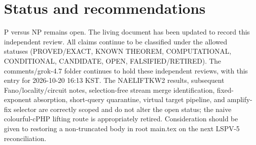 \documentclass[11pt]{article}
\begin{document}
\section{Status and recommendations}
P versus NP remains open. The living document has been updated to record this independent review. All claims continue to be classified under the allowed statuses (PROVED/EXACT, KNOWN THEOREM, COMPUTATIONAL, CONDITIONAL, CANDIDATE, OPEN, FALSIFIED/RETIRED). The comments/grok-4.7 folder continues to hold these independent reviews, with this entry for 2026-10-20 16:13 KST. The NAELIFTKW2 results, subsequent Fano/locality/circuit notes, selection-free stream merge identification, fixed-exponent absorption, short-query quarantine, virtual target pipeline, and amplify-fix selector are correctly scoped and do not alter the open status; the naive colourful-cPHP lifting route is appropriately retired. Consideration should be given to restoring a non-truncated body in root main.tex on the next LSPV-5 reconciliation.

\end{document}
